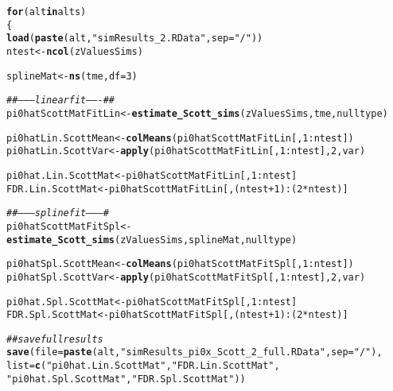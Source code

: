 \documentclass{article}\usepackage[]{graphicx}\usepackage[]{color}
\makeatletter
\newcommand{\hlnum}[1]{\textcolor[rgb]{0.686,0.059,0.569}{#1}}%
\newcommand{\hlstr}[1]{\textcolor[rgb]{0.192,0.494,0.8}{#1}}%
\newcommand{\hlcom}[1]{\textcolor[rgb]{0.678,0.584,0.686}{\textit{#1}}}%
\newcommand{\hlopt}[1]{\textcolor[rgb]{0,0,0}{#1}}%
\newcommand{\hlstd}[1]{\textcolor[rgb]{0.345,0.345,0.345}{#1}}%
\newcommand{\hlkwa}[1]{\textcolor[rgb]{0.161,0.373,0.58}{\textbf{#1}}}%
\newcommand{\hlkwb}[1]{\textcolor[rgb]{0.69,0.353,0.396}{#1}}%
\newcommand{\hlkwc}[1]{\textcolor[rgb]{0.333,0.667,0.333}{#1}}%
\newcommand{\hlkwd}[1]{\textcolor[rgb]{0.737,0.353,0.396}{\textbf{#1}}}%
\newenvironment{kframe}{%
 \def\at@end@of@kframe{}%
 \ifinner\ifhmode%
  \def\at@end@of@kframe{\end{minipage}}%
  \begin{minipage}{\columnwidth}%
 \fi\fi%
 \def\FrameCommand##1{\hskip\@totalleftmargin \hskip-\fboxsep
 \colorbox{shadecolor}{##1}\hskip-\fboxsep
     \hskip-\linewidth \hskip-\@totalleftmargin \hskip\columnwidth}%
 \MakeFramed {\advance\hsize-\width
   \@totalleftmargin\z@ \linewidth\hsize
   \@setminipage}}%
 {\par\unskip\endMakeFramed%
 \at@end@of@kframe}
\newenvironment{knitrout}{}{} %
\makeatother
\begin{document}
\begin{knitrout}
\color{fgcolor}\begin{kframe}
\begin{alltt}
\hlkwa{for}\hlstd{(alt} \hlkwa{in} \hlstd{alts)}
\hlstd{\{}
  \hlkwd{load}\hlstd{(}\hlkwd{paste}\hlstd{(alt,}\hlstr{"simResults_2.RData"}\hlstd{,}\hlkwc{sep}\hlstd{=}\hlstr{"/"}\hlstd{))}
  \hlstd{ntest} \hlkwb{<-} \hlkwd{ncol}\hlstd{(zValuesSims)}

  \hlstd{splineMat} \hlkwb{<-} \hlkwd{ns}\hlstd{(tme,}\hlkwc{df}\hlstd{=}\hlnum{3}\hlstd{)}

  \hlcom{##--------linear fit-------##}
  \hlstd{pi0hatScottMatFitLin} \hlkwb{<-} \hlkwd{estimate_Scott_sims}\hlstd{(zValuesSims, tme, nulltype)}

  \hlstd{pi0hatLin.ScottMean} \hlkwb{<-} \hlkwd{colMeans}\hlstd{(pi0hatScottMatFitLin[,}\hlnum{1}\hlopt{:}\hlstd{ntest])}
  \hlstd{pi0hatLin.ScottVar} \hlkwb{<-} \hlkwd{apply}\hlstd{(pi0hatScottMatFitLin[,}\hlnum{1}\hlopt{:}\hlstd{ntest],}\hlnum{2}\hlstd{,var)}

  \hlstd{pi0hat.Lin.ScottMat} \hlkwb{<-} \hlstd{pi0hatScottMatFitLin[,}\hlnum{1}\hlopt{:}\hlstd{ntest]}
  \hlstd{FDR.Lin.ScottMat} \hlkwb{<-} \hlstd{pi0hatScottMatFitLin[,(ntest}\hlopt{+}\hlnum{1}\hlstd{)}\hlopt{:}\hlstd{(}\hlnum{2}\hlopt{*}\hlstd{ntest)]}

  \hlcom{##---------spline fit---------#}
  \hlstd{pi0hatScottMatFitSpl} \hlkwb{<-} \hlkwd{estimate_Scott_sims}\hlstd{(zValuesSims, splineMat, nulltype)}

  \hlstd{pi0hatSpl.ScottMean} \hlkwb{<-} \hlkwd{colMeans}\hlstd{(pi0hatScottMatFitSpl[,}\hlnum{1}\hlopt{:}\hlstd{ntest])}
  \hlstd{pi0hatSpl.ScottVar} \hlkwb{<-} \hlkwd{apply}\hlstd{(pi0hatScottMatFitSpl[,}\hlnum{1}\hlopt{:}\hlstd{ntest],}\hlnum{2}\hlstd{,var)}

  \hlstd{pi0hat.Spl.ScottMat} \hlkwb{<-} \hlstd{pi0hatScottMatFitSpl[,}\hlnum{1}\hlopt{:}\hlstd{ntest]}
  \hlstd{FDR.Spl.ScottMat} \hlkwb{<-} \hlstd{pi0hatScottMatFitSpl[,(ntest}\hlopt{+}\hlnum{1}\hlstd{)}\hlopt{:}\hlstd{(}\hlnum{2}\hlopt{*}\hlstd{ntest)]}

  \hlcom{##save full results}
  \hlkwd{save}\hlstd{(}\hlkwc{file}\hlstd{=}\hlkwd{paste}\hlstd{(alt,}\hlstr{"simResults_pi0x_Scott_2_full.RData"}\hlstd{,}\hlkwc{sep}\hlstd{=}\hlstr{"/"}\hlstd{),}
       \hlkwc{list}\hlstd{=}\hlkwd{c}\hlstd{(}\hlstr{"pi0hat.Lin.ScottMat"}\hlstd{,} \hlstr{"FDR.Lin.ScottMat"}\hlstd{,}
              \hlstr{"pi0hat.Spl.ScottMat"}\hlstd{,} \hlstr{"FDR.Spl.ScottMat"}\hlstd{))}


\end{alltt}
\end{kframe}
\end{knitrout}
\end{document}
